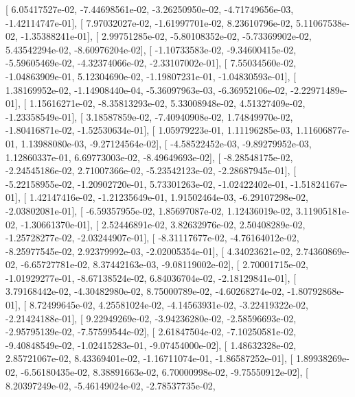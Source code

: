 \documentclass{article}
\begin{document}
       [  6.05417527e-02,  -7.44698561e-02,  -3.26250950e-02,
         -4.71749656e-03,  -1.42114747e-01],
       [  7.97032027e-02,  -1.61997701e-02,   8.23610796e-02,
          5.11067538e-02,  -1.35388241e-01],
       [  2.99751285e-02,  -5.80108352e-02,  -5.73369902e-02,
          5.43542294e-02,  -8.60976204e-02],
       [ -1.10733583e-02,  -9.34600415e-02,  -5.59605469e-02,
         -4.32374066e-02,  -2.33107002e-01],
       [  7.55034560e-02,  -1.04863909e-01,   5.12304690e-02,
         -1.19807231e-01,  -1.04830593e-01],
       [  1.38169952e-02,  -1.14908440e-04,  -5.36097963e-03,
         -6.36952106e-02,  -2.22971489e-01],
       [  1.15616271e-02,  -8.35813293e-02,   5.33008948e-02,
          4.51327409e-02,  -1.23358549e-01],
       [  3.18587859e-02,  -7.40940908e-02,   1.74849970e-02,
         -1.80416871e-02,  -1.52530634e-01],
       [  1.05979223e-01,   1.11196285e-03,   1.11606877e-01,
          1.13988080e-03,  -9.27124564e-02],
       [ -4.58522452e-03,  -9.89279952e-03,   1.12860337e-01,
          6.69773003e-02,  -8.49649693e-02],
       [ -8.28548175e-02,  -2.24545186e-02,   2.71007366e-02,
         -5.23542123e-02,  -2.28687945e-01],
       [ -5.22158955e-02,  -1.20902720e-01,   5.73301263e-02,
         -1.02422402e-01,  -1.51824167e-01],
       [  1.42147416e-02,  -1.21235649e-01,   1.91502464e-03,
         -6.29107298e-02,  -2.03802081e-01],
       [ -6.59357955e-02,   1.85697087e-02,   1.12436019e-02,
          3.11905181e-02,  -1.30661370e-01],
       [  2.52446891e-02,   3.82632976e-02,   2.50408289e-02,
         -1.25728277e-02,  -2.03244907e-01],
       [ -8.31117677e-02,  -4.76164012e-02,  -8.25977545e-02,
          2.92379992e-03,  -2.02005354e-01],
       [  4.34023621e-02,   2.74360869e-02,  -6.65727781e-02,
          8.37442163e-03,  -9.08119002e-02],
       [  2.70001715e-02,  -1.01929277e-01,  -8.67138524e-02,
          6.84036704e-02,  -2.18129841e-01],
       [  3.79168442e-02,  -4.30482980e-02,   8.75000789e-02,
         -4.60268274e-02,  -1.80792868e-01],
       [  8.72499645e-02,   4.25581024e-02,  -4.14563931e-02,
         -3.22419322e-02,  -2.21424188e-01],
       [  9.22949269e-02,  -3.94236280e-02,  -2.58596693e-02,
         -2.95795139e-02,  -7.57599544e-02],
       [  2.61847504e-02,  -7.10250581e-02,  -9.40848549e-02,
         -1.02415283e-01,  -9.07454000e-02],
       [  1.48632328e-02,   2.85721067e-02,   8.43369401e-02,
         -1.16711074e-01,  -1.86587252e-01],
       [  1.89938269e-02,  -6.56180435e-02,   8.38891663e-02,
          6.70000998e-02,  -9.75550912e-02],
       [  8.20397249e-02,  -5.46149024e-02,  -2.78537735e-02,
\end{document}
